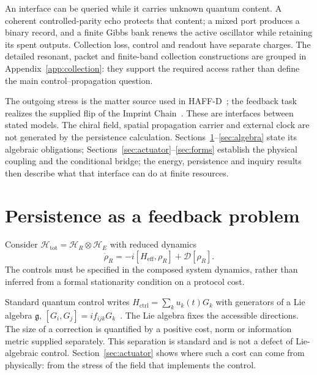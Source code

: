 \documentclass[aps,pre,onecolumn,superscriptaddress,floatfix,longbibliography]{revtex4-2}
\begin{document}
An interface can be queried while it carries unknown quantum content. A coherent controlled-parity echo protects that content; a mixed port produces a binary record, and a finite Gibbs bank renews the active oscillator while retaining its spent outputs. Collection loss, control and readout have separate charges. The detailed resonant, packet and finite-band collection constructions are grouped in Appendix~\ref{app:collection}: they support the required access rather than define the main control--propagation question.

The outgoing stress is the matter source used in HAFF-D~\cite{Liu2026HAFFD}; the feedback task realizes the supplied flip of the Imprint Chain~\cite{Liu2026Chain}. These are interfaces between stated models. The chiral field, spatial propagation carrier and external clock are not generated by the persistence calculation. Sections~\ref{sec:persistence}--\ref{sec:algebra} state its algebraic obligations; Sections~\ref{sec:actuator}--\ref{sec:forms} establish the physical coupling and the conditional bridge; the energy, persistence and inquiry results then describe what that interface can do at finite resources.

\section{Persistence as a feedback problem}
\label{sec:persistence}

Consider $\mathcal{H}_{\mathrm{tot}} = \mathcal{H}_R \otimes \mathcal{H}_E$ with reduced dynamics
\begin{equation}
\dot{\rho}_R = -i[H_{\mathrm{eff}}, \rho_R] + \mathcal{D}[\rho_R].
\end{equation}
The controls must be specified in the composed system dynamics, rather than inferred from a formal stationarity condition on a protocol cost.

Standard quantum control writes $H_{\mathrm{ctrl}} = \sum_k u_k(t) G_k$ with generators of a Lie algebra $\mathfrak g$, $[G_i, G_j] = i f_{ijk} G_k$~\cite{WisemanMilburn2009}. The Lie algebra fixes the accessible directions. The size of a correction is quantified by a positive cost, norm or information metric supplied separately. This separation is standard and is not a defect of Lie-algebraic control. Section~\ref{sec:actuator} shows where such a cost can come from physically: from the stress of the field that implements the control.

\end{document}
